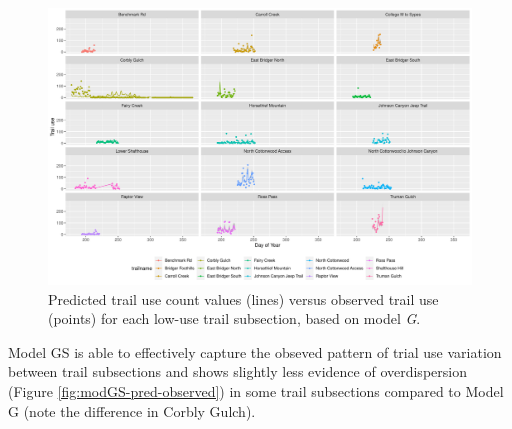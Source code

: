 \documentclass[
]{book}
\begin{document}
\begin{figure}

{\centering \includegraphics[width=1\linewidth]{../figures/low_pred_modG} 

}

\caption{Predicted trail use count values (lines) versus observed trail use (points) for each low-use trail subsection, based on model \emph{G}.}\label{fig:low-pred-G}
\end{figure}

Model GS is able to effectively capture the obseved pattern of trial use variation between trail subsections and shows slightly less evidence of overdispersion (Figure \ref{fig:modGS-pred-observed}) in some trail subsections compared to Model G (note the difference in Corbly Gulch).
\end{document}
